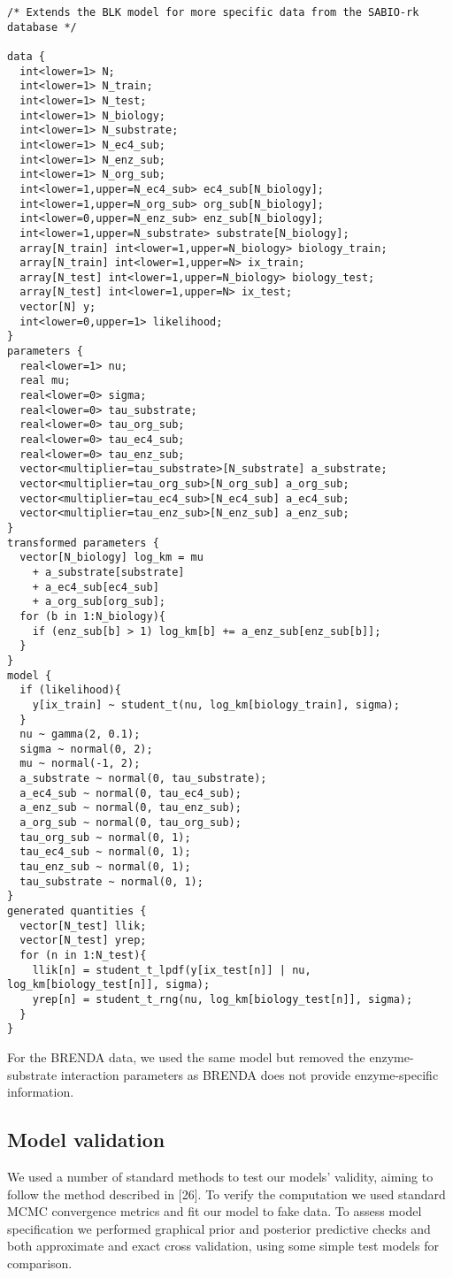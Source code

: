 \documentclass[11pt]{article}
\makeatletter
\newcommand{\citeprocitem}[2]{\hyper@linkstart{cite}{citeproc_bib_item_#1}#2\hyper@linkend}
\makeatother
\begin{document}
\begin{verbatim}
/* Extends the BLK model for more specific data from the SABIO-rk database */

data {
  int<lower=1> N;
  int<lower=1> N_train;
  int<lower=1> N_test;
  int<lower=1> N_biology;
  int<lower=1> N_substrate;
  int<lower=1> N_ec4_sub;
  int<lower=1> N_enz_sub;
  int<lower=1> N_org_sub;
  int<lower=1,upper=N_ec4_sub> ec4_sub[N_biology];
  int<lower=1,upper=N_org_sub> org_sub[N_biology];
  int<lower=0,upper=N_enz_sub> enz_sub[N_biology];
  int<lower=1,upper=N_substrate> substrate[N_biology];
  array[N_train] int<lower=1,upper=N_biology> biology_train;
  array[N_train] int<lower=1,upper=N> ix_train;
  array[N_test] int<lower=1,upper=N_biology> biology_test;
  array[N_test] int<lower=1,upper=N> ix_test;
  vector[N] y;
  int<lower=0,upper=1> likelihood;
}
parameters {
  real<lower=1> nu;
  real mu;
  real<lower=0> sigma;
  real<lower=0> tau_substrate;
  real<lower=0> tau_org_sub;
  real<lower=0> tau_ec4_sub;
  real<lower=0> tau_enz_sub;
  vector<multiplier=tau_substrate>[N_substrate] a_substrate;
  vector<multiplier=tau_org_sub>[N_org_sub] a_org_sub;
  vector<multiplier=tau_ec4_sub>[N_ec4_sub] a_ec4_sub;
  vector<multiplier=tau_enz_sub>[N_enz_sub] a_enz_sub;
}
transformed parameters {
  vector[N_biology] log_km = mu
    + a_substrate[substrate]
    + a_ec4_sub[ec4_sub]
    + a_org_sub[org_sub];
  for (b in 1:N_biology){
    if (enz_sub[b] > 1) log_km[b] += a_enz_sub[enz_sub[b]];
  }
}
model {
  if (likelihood){
    y[ix_train] ~ student_t(nu, log_km[biology_train], sigma);
  }
  nu ~ gamma(2, 0.1);
  sigma ~ normal(0, 2);
  mu ~ normal(-1, 2);
  a_substrate ~ normal(0, tau_substrate);
  a_ec4_sub ~ normal(0, tau_ec4_sub);
  a_enz_sub ~ normal(0, tau_enz_sub);
  a_org_sub ~ normal(0, tau_org_sub);
  tau_org_sub ~ normal(0, 1);
  tau_ec4_sub ~ normal(0, 1);
  tau_enz_sub ~ normal(0, 1);
  tau_substrate ~ normal(0, 1);
}
generated quantities {
  vector[N_test] llik;
  vector[N_test] yrep;
  for (n in 1:N_test){
    llik[n] = student_t_lpdf(y[ix_test[n]] | nu, log_km[biology_test[n]], sigma);
    yrep[n] = student_t_rng(nu, log_km[biology_test[n]], sigma);
  }
}
\end{verbatim}

For the BRENDA data, we used the same model but removed the enzyme-substrate
interaction parameters as BRENDA does not provide enzyme-specific information.

\subsection{Model validation}
\label{sec:org77f9da4}
We used a number of standard methods to test our models' validity, aiming to
follow the method described in \citeprocitem{26}{[26]}. To verify the
computation we used standard MCMC convergence metrics and fit our model to fake
data. To assess model specification we performed graphical prior and posterior
predictive checks and both approximate and exact cross validation, using some
simple test models for comparison.
\end{document}
